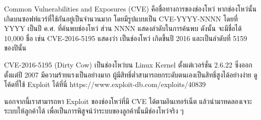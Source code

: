 Common Vulnerabilities and Exposures (CVE) \cite{https://cve.mitre.org/} คือชื่อทางการของช่องโหว่ หากช่องโหว่นั้นเกิดบนซอฟท์แวร์ที่ใช้กันอยู่เป็นจำนวนมาก โดยมีรูปแบบเป็น CVE-YYYY-NNNN โดยที่ YYYY เป็นปี ค.ศ. ที่ค้นพบช่องโหว่ ส่วน NNNN แสดงลำดับในการค้นพบ ดังนั้น จะมีชื่อได้ 10,000 ชื่อ เช่น CVE-2016-5195  \cite{https://dirtycow.ninja/} แสดงว่า เป็นช่องโหว่ เกิดขึ้นปี 2016 และเป็นลำดับที่ 5159 ของปีนั้น

CVE-2016-5195 (Dirty Cow) เป็นช่องโหว่บน Linux Kernel ตั้งแต่เวอร์ชั่น 2.6.22 ซึ่งออกตั้งแต่ปี 2007 มีความร้ายแรงเป็นอย่างมาก ผู้มีสิทธิ์ต่ำสามารถยกระดับตนเองเป็นสิทธิ์สูงได้อย่างง่าย ดูโค้ดที่ใช้ Exploit ได้ที่นี่ https://www.exploit-db.com/exploits/40839

นอกจากนี้เราสามารถหา Exploit ของช่องโหว่ที่มี CVE ได้ตามอินเทอร์เน็ต แล้วนำมาทดลองเจาะระบบให้ลูกค้าได้ เพื่อเป็นการพิสูจน์ว่าระบบของลูกค้านั้นมีช่องโหว่จริง ๆ